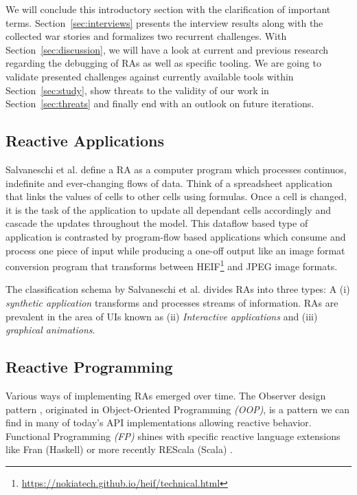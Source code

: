 \documentclass[12pt,a4paper]{article}
\begin{document}
We will conclude this introductory section with the clarification of important terms. Section~\ref{sec:interviews} presents the interview results along with the collected war stories and formalizes two recurrent challenges. With Section~\ref{sec:discussion}, we will have a look at current and previous research regarding the debugging of RAs as well as specific tooling. We are going to validate presented challenges against currently available tools within Section~\ref{sec:study}, show threats to the validity of our work in Section~\ref{sec:threats} and finally end with an outlook on future iterations.

\subsection{Reactive Applications}

Salvaneschi et al. \cite{7827078} define a RA as a computer program which processes continuos, indefinite and ever-changing flows of data. Think of a spreadsheet application\cite{10.1145/2501654.2501666} that links the values of cells to other cells using formulas. Once a cell is changed, it is the task of the application to update all dependant cells accordingly and cascade the updates throughout the model. This dataflow based type of application is contrasted by program-flow based applications which consume and process one piece of input while producing a one-off output like an image format conversion program that transforms between HEIF\footnote{\url{https://nokiatech.github.io/heif/technical.html}} and JPEG image formats.

The classification schema by Salvaneschi et al. \cite{7827078} divides RAs into three types: A (i) \emph{synthetic application} transforms and processes streams of information. RAs are prevalent in the area of UIs known as (ii) \emph{Interactive applications} and (iii) \emph{graphical animations}.

\subsection{Reactive Programming}

Various ways of implementing RAs emerged over time. The Observer design pattern \cite{gamma1995design}, originated in Object-Oriented Programming \emph{(OOP)}, is a pattern we can find in many of today's API implementations\cite{alabor:2019:reactiveappllications} allowing reactive behavior. Functional Programming \emph{(FP)} shines with specific reactive language extensions like Fran (Haskell) \cite{10.1145/2501654.2501666} or more recently REScala (Scala) \cite{10.1145/2577080.2577083}.
\end{document}
